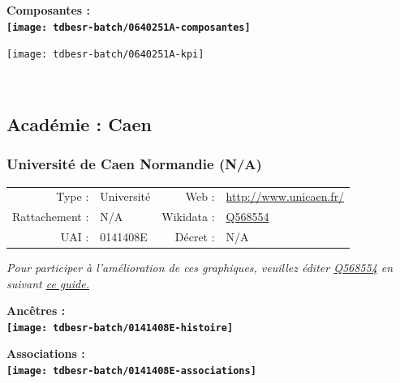\documentclass[12pt,french,]{article}
\begin{document}
\hrulefill

\begin{center} \bf Composantes : \\  
\texttt{[image: tdbesr-batch/0640251A-composantes]} \end{center}

\begin{center}\texttt{[image: tdbesr-batch/0640251A-kpi]} \end{center}\checkoddpage

\ifoddpage ~\newpage \fi   

\hypertarget{acaduxe9mie-caen}{%
\subsection{Académie : Caen}\label{acaduxe9mie-caen}}

\hypertarget{universituxe9-de-caen-normandie-na}{%
\subsubsection{Université de Caen Normandie
(N/A)}\label{universituxe9-de-caen-normandie-na}}

\begin{tabular*}{\textwidth}{rp{5cm}rl}  
\hline  
Type : & Université & Web : &\href{http://www.unicaen.fr/}{http://www.unicaen.fr/} \\  
Rattachement : & N/A & Wikidata : & \href{https://www.wikidata.org/entity/Q568554}{Q568554} \\  
UAI : & 0141408E & Décret : & N/A \\  
\hline  
\end{tabular*}

\textit{\scriptsize Pour participer à l'amélioration de ces graphiques, veuillez éditer  \href{https://www.wikidata.org/entity/Q568554}{Q568554}  en suivant \href{https://github.com/cpesr/wikidataESR/blob/master/Rmd/wikidataESR.md}{ce guide.}}

\vspace{1cm}  
\begin{minipage}[b]{0.50\textwidth}\begin{center} \bf Ancêtres : \\  
\texttt{[image: tdbesr-batch/0141408E-histoire]} \end{center}\end{minipage}\begin{minipage}[b]{0.50\textwidth}\begin{center} \bf Associations : \\  
\texttt{[image: tdbesr-batch/0141408E-associations]} \end{center}\end{minipage}
\end{document}

